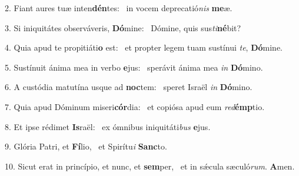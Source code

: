 2. Fiant aures tuæ inten\textbf{dén}tes: \ast\  in vocem deprecatió\textit{nis} \textbf{me}æ.\

3. Si iniquitátes observáveris, \textbf{Dó}mine: \ast\  Dómine, quis sus\textit{ti}\textbf{né}bit?\

4. Quia apud te propitiáti\textbf{o} est: \ast\  et propter legem tuam sustínui \textit{te}, \textbf{Dó}mine.\

5. Sustínuit ánima mea in verbo \textbf{e}jus: \ast\  sperávit ánima mea \textit{in} \textbf{Dó}mino.\

6. A custódia matutína usque ad \textbf{noc}tem: \ast\  speret Israël \textit{in} \textbf{Dó}mino.\

7. Quia apud Dóminum miseri\textbf{cór}dia: \ast\  et copiósa apud eum \textit{red}\textbf{émp}tio.\

8. Et ipse rédimet \textbf{Is}raël: \ast\  ex ómnibus iniquitáti\textit{bus} \textbf{e}jus.\

9. Glória Patri, et \textbf{Fí}lio, \ast\  et Spirítu\textit{i} \textbf{Sanc}to.\

10. Sicut erat in princípio, et nunc, et \textbf{sem}per, \ast\  et in sǽcula sæculó\textit{rum}. \textbf{A}men.\


